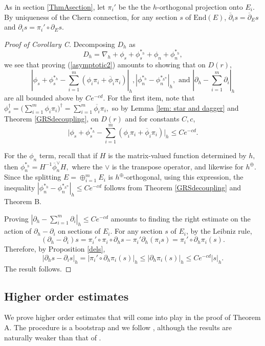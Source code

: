 \documentclass[10pt]{amsart}
\theoremstyle{definition}
\begin{document}
As in section \ref{ThmAsection}, let $\pi_i'$ be the 
the $h$-orthogonal projection onto $E_i$. By uniqueness of the Chern connection, for any section $s$ of $\textrm{End}(E)$, $\overline{\partial}_i s=\overline{\partial}_E s$ and $\partial_i s=\pi_{i}'\circ \partial_E s.$ 
    \begin{proof}[Proof of Corollary C]
    Decomposing $D_h$ as $$D_h = \nabla_h + \phi_s+\phi_s^{*_h}+\phi_n+\phi_n^{*_h},$$ we see that proving (\ref{asymptotic2}) amounts to showing that on $D(r),$ $$ |\phi_s+\phi_s^{*_h}-\sum_{i=1}^m (\phi_i\pi_i+\overline{\phi}_i\pi_i) |_{h}, |\phi_n^{*_h}-\phi_n^{*_{h^{\oplus}}}|_h, \textrm{ and } |\partial_h - \sum_{i=1}^m \partial_i|_h$$ are all bounded above by $Ce^{-cd}.$ For the first item, note that $\phi_s^\dagger=\Big (\sum_{i=1}^m \phi_i\pi_i\Big )^\dagger= \sum_{i=1}^m \overline{\phi_i}\pi_i,$ so by Lemma \ref{lem: star and dagger} and Theorem \ref{GRSdecoupling}, on $D(r)$ and for constants $C,c$,
$$\Big |\phi_s+\phi_s^{*_h}-\sum_{i=1}^m (\phi_i\pi_i+\overline{\phi}_i\pi_i)\Big |_{h}\leq Ce^{-cd}.$$ 

For the $\phi_n$ term, recall that if $H$ is the matrix-valued function determined by $h,$ then $\phi_n^{*_h}=H^{-1}\overline{\phi}_n^\vee H, $ where the $\vee$ is the transpose operator, and likewise for $h^{\oplus}$. Since the splitting $E=\oplus_{i=1}^m E_i$ is $h^\oplus$-orthogonal, using this expression, the inequality $|\phi_n^{*_h}-\phi_n^{*_{h^{\oplus}}}|_h\leq Ce^{-cd}$ follows from Theorem \ref{GRSdecoupling} and Theorem B.

Proving $|\partial_h - \sum_{i=1}^m \partial_i|_h\leq Ce^{-cd}$ amounts to finding the right estimate on the action of $\partial_h-\partial_i$ on sections of $E_i$.
For any section $s$ of $E_i$, by the Leibniz rule, $$(\partial_h-\partial_i) s  = \pi_i'\circ \pi_i \circ \partial_h s - \pi_i'\partial_h(\pi_i s)=\pi_i'\circ \partial_h\pi_i(s).$$ Therefore, by Proposition \ref{dels}, $$|\partial_h s - \partial_i s|_{h}= |\pi_i'\circ \partial_h\pi_i(s)|_{h}\leq |\partial_h\pi_i(s)|_{h}\leq Ce^{-cd}|s|_h.$$ The result follows. 
    \end{proof}

\subsection{Higher order estimates}
We prove higher order estimates that will come into play in the proof of Theorem A.  The procedure is a bootstrap and we follow \cite[section 2.25]{Mo}, although the results are naturally weaker than that of \cite{Mo}.
\end{document}
